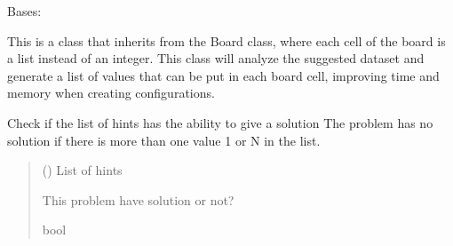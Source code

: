 \documentclass[letterpaper,10pt,english]{sphinxmanual}
\begin{document}
\begin{fulllineitems}
\label{\detokenize{condition_analysis:condition_analysis.CondBoard}}
\pysigstartsignatures
{}
\pysigstopsignatures
\sphinxAtStartPar
Bases: {\hyperref[\detokenize{board:board.Board}]{}}

\sphinxAtStartPar
This is a class that inherits from the Board class,
where each cell of the board is a list instead of an integer.
This class will analyze the suggested dataset and generate a
list of values that can be put in each board cell, improving
time and memory when creating configurations.

\begin{fulllineitems}
\label{\detokenize{condition_analysis:condition_analysis.CondBoard.noSolutionCheck}}
\pysigstartsignatures
{}
\pysigstopsignatures
\sphinxAtStartPar
Check if the list of hints has the ability to give a solution
The problem has no solution if there is more than one value
1 or N in the list.
\begin{quote}\begin{description}
\sphinxAtStartPar
{} () \textendash{} List of hints

\sphinxAtStartPar
This problem have solution or not?

\sphinxAtStartPar
bool

\end{description}\end{quote}

\end{fulllineitems}



\end{fulllineitems}
\end{document}
